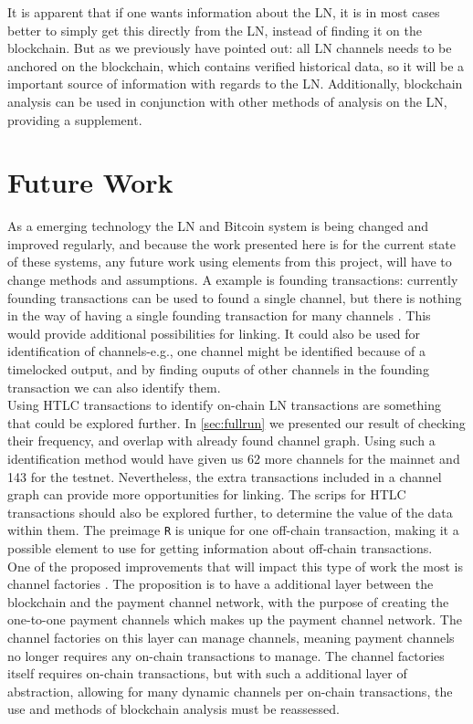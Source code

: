 It is apparent that if one wants information about the LN, it is in most cases better to simply get this directly from the LN, instead of finding it on the blockchain.
But as we previously have pointed out: all LN channels needs to be anchored on the blockchain, which contains verified historical data, so it will be a important source of information with regards to the LN. 
Additionally, blockchain analysis can be used in conjunction with other methods of analysis on the LN, providing a supplement. 

\section{Future Work}
\label{sec:future}

As a emerging technology the LN and Bitcoin system is being changed and improved regularly, and because the work presented here is for the current state of these systems, any future work using elements from this project, will have to change methods and assumptions.
A example is founding transactions: currently founding transactions can be used to found a single channel, but there is nothing in the way of having a single founding transaction for many channels \cite{multi_channel_founding}.
This would provide additional possibilities for linking.
It could also be used for identification of channels-e.g., one channel might be identified because of a timelocked output, and by finding ouputs of other channels in the founding transaction we can also identify them.
\\

Using HTLC transactions to identify on-chain LN transactions are something that could be explored further. In \cref{sec:fullrun} we presented our result of checking their frequency, and overlap with already found channel graph. Using such a identification method would have given us 62 more channels for the mainnet and 143 for the testnet. Nevertheless, the extra transactions included in a channel graph can provide more opportunities for linking. The scrips for HTLC transactions should also be explored further, to determine the value of the data within them.
The preimage {\tt R} is unique for one off-chain transaction, making it a possible element to use for getting information about off-chain transactions.
\\

One of the proposed improvements that will impact this type of work the most is channel factories \cite{burchert2017scalable}.
The proposition is to have a additional layer between the blockchain and the payment channel network, with the purpose of creating the one-to-one payment channels which makes up the payment channel network.
The channel factories on this layer can manage channels, meaning payment channels no longer requires any on-chain transactions to manage.
The channel factories itself requires on-chain transactions, but with such a additional layer of abstraction, allowing for many dynamic channels per on-chain transactions, the use and methods of blockchain analysis must be reassessed.
\\
